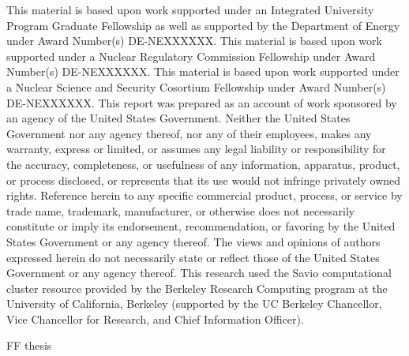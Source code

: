 \documentclass{ucbthesis}
\begin{document}
\begin{frontmatter}


\setcounter{secnumdepth}{3}
\setcounter{tocdepth}{3}


\tableofcontents
\clearpage
\listoffigures
\clearpage
\listoftables

\begin{acknowledgements}
\small

\scriptsize{This material is based upon work supported under an Integrated
University Program Graduate Fellowship as well as supported by the Department 
of Energy under Award Number(s) DE-NEXXXXXX. 
This material is based upon work supported under a Nuclear Regulatory 
Commission Fellowship under Award Number(s) DE-NEXXXXXX. 
This material is based upon work supported under a Nuclear Science and Security 
Cosortium Fellowship under Award Number(s) DE-NEXXXXXX. 
This report was prepared as an account  of work sponsored by an agency of the 
United States Government. Neither the United 
States Government nor any agency thereof, nor any of their employees, makes any 
warranty, express or limited, or assumes any legal liability or responsibility for the 
accuracy, completeness, or usefulness of any information, apparatus, product, or
process disclosed, or represents that its use would not infringe privately owned
rights. Reference herein to any specific commercial product, process, or service by
trade name, trademark, manufacturer, or otherwise does not necessarily constitute or
imply its endorsement, recommendation, or favoring by the United States Government or
any agency thereof. The views and opinions of authors expressed herein do not 
necessarily state or reflect those of the United States Government or any agency 
thereof. This research used the Savio computational cluster resource provided by the 
Berkeley Research Computing program at the University of California, Berkeley 
(supported by the UC Berkeley Chancellor, Vice Chancellor for Research, and Chief 
Information Officer).}

\end{acknowledgements}

\end{frontmatter}

\pagestyle{headings}








\def\StripPrefix#1>{}
\def\jobis#1{FF\fi
  \def\predicate{#1}%
  \edef\predicate{\expandafter\StripPrefix\meaning\predicate}%
  \edef\job{\jobname}%
  \ifx\job\predicate
}

\if\jobis{thesis}
  \printbibliography
\else
  \newpage
  \renewcommand{\thepage}{}
  \printbibliography
\fi

% 
\end{document}
